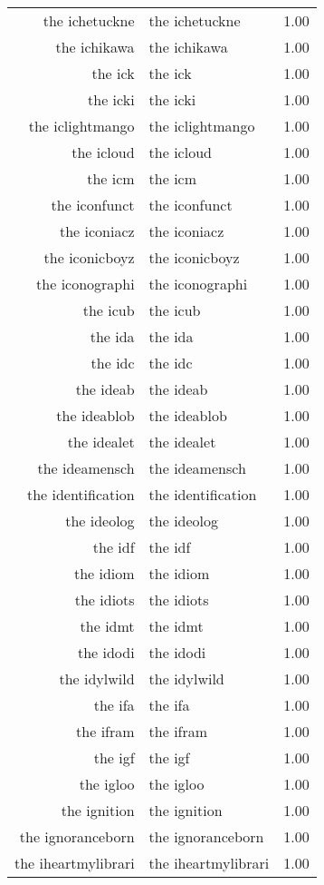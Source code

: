 \begin{table}[ht]
\begin{tabular}{rlr}
  the ichetuckne & the ichetuckne & 1.00 \\ 
  the ichikawa & the ichikawa & 1.00 \\ 
  the ick & the ick & 1.00 \\ 
  the icki & the icki & 1.00 \\ 
  the iclightmango & the iclightmango & 1.00 \\ 
  the icloud & the icloud & 1.00 \\ 
  the icm & the icm & 1.00 \\ 
  the iconfunct & the iconfunct & 1.00 \\ 
  the iconiacz & the iconiacz & 1.00 \\ 
  the iconicboyz & the iconicboyz & 1.00 \\ 
  the iconographi & the iconographi & 1.00 \\ 
  the icub & the icub & 1.00 \\ 
  the ida & the ida & 1.00 \\ 
  the idc & the idc & 1.00 \\ 
  the ideab & the ideab & 1.00 \\ 
  the ideablob & the ideablob & 1.00 \\ 
  the idealet & the idealet & 1.00 \\ 
  the ideamensch & the ideamensch & 1.00 \\ 
  the identification & the identification & 1.00 \\ 
  the ideolog & the ideolog & 1.00 \\ 
  the idf & the idf & 1.00 \\ 
  the idiom & the idiom & 1.00 \\ 
  the idiots & the idiots & 1.00 \\ 
  the idmt & the idmt & 1.00 \\ 
  the idodi & the idodi & 1.00 \\ 
  the idylwild & the idylwild & 1.00 \\ 
  the ifa & the ifa & 1.00 \\ 
  the ifram & the ifram & 1.00 \\ 
  the igf & the igf & 1.00 \\ 
  the igloo & the igloo & 1.00 \\ 
  the ignition & the ignition & 1.00 \\ 
  the ignoranceborn & the ignoranceborn & 1.00 \\ 
  the iheartmylibrari & the iheartmylibrari & 1.00 \\ 

\end{tabular}
\end{table}
